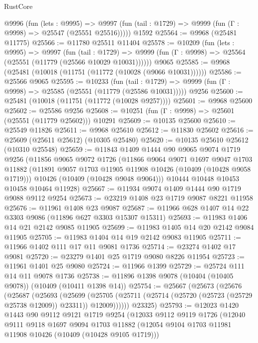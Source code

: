 \begin{lexlean}{RustCore}
\begin{coremodule}
    @9996
      (fun (lets : @9995) =>
      @9997 (fun (tail : @1729) => @9999 (fun (Γ : @9998) => @25547 (@25551 @25516)))))
    @1592
@25564 := @9968 (@25481 @11775)
@25566 := @11780 @25511 @11404
@25578 := @10209
    (fun (lets : @9995) =>
    @9997
      (fun (tail : @1729) =>
      @9999 (fun (Γ : @9998) => @25564 (@25551 (@11779 (@25566 @10029 @10031))))))
    @9065
@25585 := @9968 (@25481 (@10018 (@11751 (@11772 (@10028 (@9066 @10031))))))
@25586 := @25566 @9065
@25595 := @10233
    (fun (tail : @1729) => @9999 (fun (Γ : @9998) => @25585 (@25551 (@11779 (@25586 @10031)))))
    @9256
@25600 := @25481 (@10018 (@11751 (@11772 (@10028 @9257))))
@25601 := @9968 @25600
@25602 := @25586 @9256
@25608 := @10251 (fun (Γ : @9998) => @25601 (@25551 (@11779 @25602))) @10291
@25609 := @10135 @25600
@25610 := @25549 @11826
@25611 := @9968 @25610
@25612 := @11830 @25602
@25616 := @25609 (@25611 @25612) (@10305 @25480)
@25620 := @10135 @25610 @25612 (@10310 @25548)
@25659 := @11843
    @1409
    @1444
    @90
    @9065
    @9074
    @1719
    @9256
    (@11856
      @9065
      @9072
      @1726
      (@11866
        @9064
        @9071
        @1697
        @9047
        @1703
        @11882
        (@11891 @9057 @1703 @11905 @11908 @10426 (@10409 (@10428 @9058 @1719)))
        @10426
        (@10409 (@10428 @9048 @9064)))
      @10444
      @10448
      @10453
      @10458
      @10464
      @11928)
@25667 := @11934 @9074 @1409 @1444 @90 @1719 @9088 @9112 @9254
@25673 := @23219 @1408 @23 @1719 @9087 @8221 @11958
@25676 := @11961 @1408 @23 @9087
@25687 := @11966 @628 @1407 @14 @22 @3303 @9086 (@11896 @627 @3303 @15307 @15311)
@25693 := @11983 @1406 @14 @21 @2142 @9085 @11905
@25699 := @11983 @1405 @14 @20 @2142 @9084 @11905
@25705 := @11983 @1404 @14 @19 @2142 @9083 @11905
@25711 := @11966 @1402 @111 @17 @11 @9081 @1736
@25714 := @23274 @1402 @17 @9081
@25720 := @23279 @1401 @25 @1719 @9080 @8226 @11954
@25723 := @11961 @1401 @25 @9080
@25724 := @11966 @1399
@25729 := @25724 @111 @14 @11 @9078 @1736
@25738 := @11896 @1398 @9078 (@10404 (@10405 @9078)) (@10409 (@10411 @1398 @14))
@25754 := @25667
    (@25673
      (@25676
        (@25687
          (@25693
            (@25699
              (@25705 (@25711 (@25714 (@25720 (@25723 (@25729 @25738 @12009)) @23311)) @12009))))))
      @23325)
@25793 := @12023
    @1420
    @1443
    @90
    @9112
    @9121
    @1719
    @9254
    (@12033
      @9112
      @9119
      @1726
      (@12040
        @9111
        @9118
        @1697
        @9094
        @1703
        @11882
        (@12054 @9104 @1703 @11981 @11908 @10426 (@10409 (@10428 @9105 @1719)))

\end{coremodule}
\end{lexlean}

